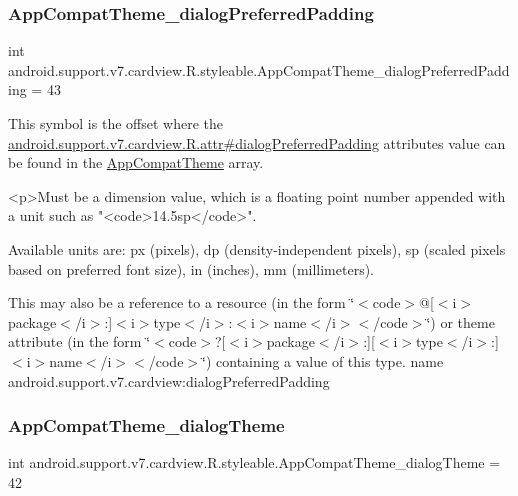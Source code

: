 \subsubsection{\texorpdfstring{App\+Compat\+Theme\+\_\+dialog\+Preferred\+Padding}{AppCompatTheme\_dialogPreferredPadding}}
{\footnotesize\ttfamily int android.\+support.\+v7.\+cardview.\+R.\+styleable.\+App\+Compat\+Theme\+\_\+dialog\+Preferred\+Padding = 43\hspace{0.3cm}{\ttfamily [static]}}

This symbol is the offset where the \hyperlink{classandroid_1_1support_1_1v7_1_1cardview_1_1R_1_1attr_ae210dc8e855ef1c7aa0c74827cef736b}{android.\+support.\+v7.\+cardview.\+R.\+attr\#dialog\+Preferred\+Padding} attribute\textquotesingle{}s value can be found in the \hyperlink{classandroid_1_1support_1_1v7_1_1cardview_1_1R_1_1styleable_a52e6f69f954ecc2622d72c0b4d298938}{App\+Compat\+Theme} array.

\begin{DoxyVerb}      <p>Must be a dimension value, which is a floating point number appended with a unit such as "<code>14.5sp</code>".
\end{DoxyVerb}
 Available units are\+: px (pixels), dp (density-\/independent pixels), sp (scaled pixels based on preferred font size), in (inches), mm (millimeters). 

This may also be a reference to a resource (in the form \char`\"{}$<$code$>$@\mbox{[}$<$i$>$package$<$/i$>$\+:\mbox{]}$<$i$>$type$<$/i$>$\+:$<$i$>$name$<$/i$>$$<$/code$>$\char`\"{}) or theme attribute (in the form \char`\"{}$<$code$>$?\mbox{[}$<$i$>$package$<$/i$>$\+:\mbox{]}\mbox{[}$<$i$>$type$<$/i$>$\+:\mbox{]}$<$i$>$name$<$/i$>$$<$/code$>$\char`\"{}) containing a value of this type.  name android.\+support.\+v7.\+cardview\+:dialog\+Preferred\+Padding \mbox{\label{classandroid_1_1support_1_1v7_1_1cardview_1_1R_1_1styleable_a75ef082c5a516f8dbdbfe7ada1a403ec}} 
\subsubsection{\texorpdfstring{App\+Compat\+Theme\+\_\+dialog\+Theme}{AppCompatTheme\_dialogTheme}}
{\footnotesize\ttfamily int android.\+support.\+v7.\+cardview.\+R.\+styleable.\+App\+Compat\+Theme\+\_\+dialog\+Theme = 42\hspace{0.3cm}{\ttfamily [static]}}

